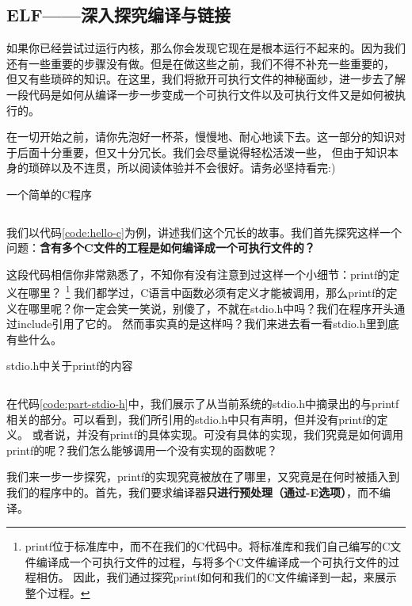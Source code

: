 \subsection{ELF——深入探究编译与链接}
如果你已经尝试过运行内核，那么你会发现它现在是根本运行不起来的。因为我们还有一些重要的步骤没有做。但是在做这些之前，我们不得不补充一些重要的，
但又有些琐碎的知识。在这里，我们将掀开可执行文件的神秘面纱，进一步去了解一段代码是如何从编译一步一步变成一个可执行文件以及可执行文件又是如何被执行的。

在一切开始之前，请你先泡好一杯茶，慢慢地、耐心地读下去。这一部分的知识对于后面十分重要，但又十分冗长。我们会尽量说得轻松活泼一些，
但由于知识本身的琐碎以及不连贯，所以阅读体验并不会很好。请务必坚持看完:)

\begin{codeBoxWithCaption}{一个简单的C程序\label{code:hello-c}}
  \inputminted[linenos]{c}{codes/hello.c}
\end{codeBoxWithCaption}

我们以代码\ref{code:hello-c}为例，讲述我们这个冗长的故事。我们首先探究这样一个问题：\textbf{含有多个C文件的工程是如何编译成一个可执行文件的？}

这段代码相信你非常熟悉了，不知你有没有注意到过这样一个小细节：printf的定义在哪里？
\footnote{printf位于标准库中，而不在我们的C代码中。将标准库和我们自己编写的C文件编译成一个可执行文件的过程，与将多个C文件编译成一个可执行文件的过程相仿。
因此，我们通过探究printf如何和我们的C文件编译到一起，来展示整个过程。}
我们都学过，C语言中函数必须有定义才能被调用，那么printf的定义在哪里呢？你一定会笑一笑说，别傻了，不就在stdio.h中吗？我们在程序开头通过include引用了它的。
然而事实真的是这样吗？我们来进去看一看stdio.h里到底有些什么。

\begin{codeBoxWithCaption}{stdio.h中关于printf的内容\label{code:part-stdio-h}}
  \inputminted[linenos]{c}{codes/part_of_stdio.h}
\end{codeBoxWithCaption}

在代码\ref{code:part-stdio-h}中，我们展示了从当前系统的stdio.h中摘录出的与printf相关的部分。可以看到，我们所引用的stdio.h中只有声明，但并没有printf的定义。
或者说，并没有printf的具体实现。可没有具体的实现，我们究竟是如何调用printf的呢？我们怎么能够调用一个没有实现的函数呢？

我们来一步一步探究，printf的实现究竟被放在了哪里，又究竟是在何时被插入到我们的程序中的。首先，我们要求编译器\textbf{只进行预处理（通过-E选项）}，而不编译。

